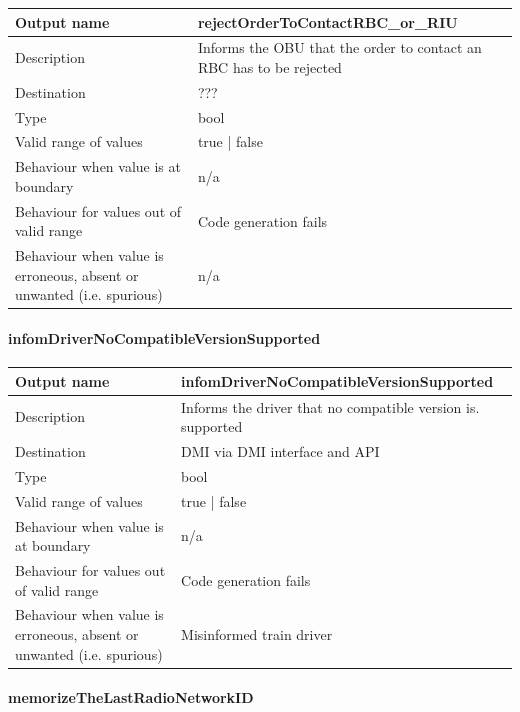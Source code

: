 \begin{longtable}{p{}p{}}
	\toprule
	Output name				& rejectOrderToContactRBC\_or\_RIU \\
	\midrule
	Description				& Informs the OBU that the order to contact an RBC has to be rejected \\
	\midrule
	Destination				& ??? \\ 
	\midrule
	Type					& bool \\
	\midrule
	Valid range of values	& true | false \\
	\midrule
	Behaviour when value is at boundary	& n/a \\
	\midrule
	Behaviour for values out of valid range	& Code generation fails \\
	\midrule
	Behaviour when value is erroneous, absent or unwanted (i.e. spurious) & n/a \\
	\bottomrule
\end{longtable}

\paragraph{infomDriverNoCompatibleVersionSupported}

\begin{longtable}{p{}p{}}
	\toprule
	Output name				& infomDriverNoCompatibleVersionSupported \\
	\midrule
	Description				& Informs the driver that no compatible version is. supported \\
	\midrule
	Destination				& DMI via DMI interface and API \\ 
	\midrule
	Type					& bool \\
	\midrule
	Valid range of values	& true | false \\
	\midrule
	Behaviour when value is at boundary	& n/a \\
	\midrule
	Behaviour for values out of valid range	& Code generation fails \\
	\midrule
	Behaviour when value is erroneous, absent or unwanted (i.e. spurious) & Misinformed train driver \\
	\bottomrule
\end{longtable}

\paragraph{memorizeTheLastRadioNetworkID}

